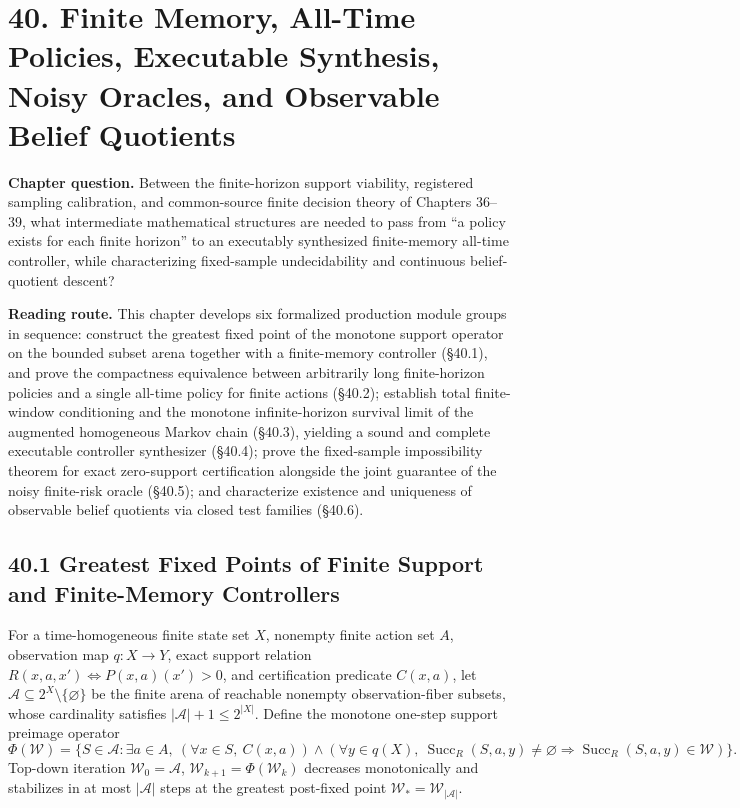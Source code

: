 \documentclass[
  english,
  11pt,
  oneside]{book}
\newcounter{none} %
\begin{document}
\chapter{40. Finite Memory, All-Time Policies, Executable Synthesis, Noisy Oracles, and Observable Belief Quotients}\label{ch-40}

\textbf{Chapter question.} Between the finite-horizon support viability, registered sampling calibration, and common-source finite decision theory of Chapters 36--39, what intermediate mathematical structures are needed to pass from ``a policy exists for each finite horizon'' to an executably synthesized finite-memory all-time controller, while characterizing fixed-sample undecidability and continuous belief-quotient descent?

\textbf{Reading route.} This chapter develops six formalized production module groups in sequence: construct the greatest fixed point of the monotone support operator on the bounded subset arena together with a finite-memory controller (§40.1), and prove the compactness equivalence between arbitrarily long finite-horizon policies and a single all-time policy for finite actions (§40.2); establish total finite-window conditioning and the monotone infinite-horizon survival limit of the augmented homogeneous Markov chain (§40.3), yielding a sound and complete executable controller synthesizer (§40.4); prove the fixed-sample impossibility theorem for exact zero-support certification alongside the joint guarantee of the noisy finite-risk oracle (§40.5); and characterize existence and uniqueness of observable belief quotients via closed test families (§40.6).

\section{40.1 Greatest Fixed Points of Finite Support and Finite-Memory Controllers}\label{greatest-fixed-points-of-finite-support-and-finite-memory-controllers}

For a time-homogeneous finite state set \(X\), nonempty finite action set \(A\), observation map \(q:X\to Y\), exact support relation \(R(x,a,x')\iff P(x,a)(x')>0\), and certification predicate \(C(x,a)\), let \(\mathcal A\subseteq 2^X\setminus\{\varnothing\}\) be the finite arena of reachable nonempty observation-fiber subsets, whose cardinality satisfies \(|\mathcal A|+1\le 2^{|X|}\). Define the monotone one-step support preimage operator \[\Phi(\mathcal W)=\bigl\{S\in\mathcal A:\exists a\in A,\ (\forall x\in S,\ C(x,a))\wedge(\forall y\in q(X),\ \operatorname{Succ}_R(S,a,y)\neq\varnothing\Rightarrow\operatorname{Succ}_R(S,a,y)\in\mathcal W)\bigr\}.\] Top-down iteration \(\mathcal W_0=\mathcal A\), \(\mathcal W_{k+1}=\Phi(\mathcal W_k)\) decreases monotonically and stabilizes in at most \(|\mathcal A|\) steps at the greatest post-fixed point \(\mathcal W_*=\mathcal W_{|\mathcal A|}\).
\end{document}
